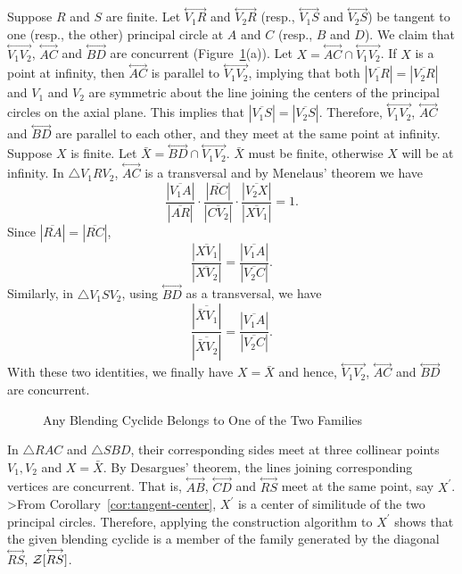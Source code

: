      Suppose $R$ and $S$ are finite. 
Let $\stackrel{\longleftrightarrow}{V_1R}$ and 
$\stackrel{\longleftrightarrow}{V_2R}$ (resp., 
$\stackrel{\longleftrightarrow}{V_1S}$ and
$\stackrel{\longleftrightarrow}{V_2S}$) be tangent to one (resp., the other)
principal circle at $A$ and $C$ (resp., $B$ and $D$).  We claim that
$\stackrel{\longleftrightarrow}{V_1V_2}$,
$\stackrel{\longleftrightarrow}{AC}$ and
$\stackrel{\longleftrightarrow}{BD}$ are concurrent 
(Figure~\ref{fig:concurrent}(a)).  
Let $X=\stackrel{\longleftrightarrow}{AC}\cap
\stackrel{\longleftrightarrow}{V_1V_2}$.  If $X$ is a point at infinity, then
$\stackrel{\longleftrightarrow}{AC}$ is parallel to
$\stackrel{\longleftrightarrow}{V_1V_2}$, implying that both
$|\overline{V_1R}|=|\overline{V_2R}|$ and $V_1$ and $V_2$ are symmetric about 
the line joining the centers of the principal circles on the axial plane.  
This implies that $|\overline{V_1S}|=|\overline{V_2S}|$.  Therefore, 
$\stackrel{\longleftrightarrow}{V_1V_2}$,
$\stackrel{\longleftrightarrow}{AC}$ and
$\stackrel{\longleftrightarrow}{BD}$ are parallel to each other, and
they meet at the same point at infinity.
Suppose $X$ is finite.  Let $\bar{X}=\stackrel{\longleftrightarrow}{BD}\cap
\stackrel{\longleftrightarrow}{V_1V_2}$.  $\bar{X}$ must be finite, otherwise
$X$ will be at infinity.  In $\bigtriangleup V_1RV_2$,
$\stackrel{\longleftrightarrow}{AC}$ is a transversal and by Menelaus' theorem
we have 
\[ \frac{|\overline{V_1A}|}{|\overline{AR}|}\cdot
   \frac{|\overline{RC}|}{|\overline{CV_2}|}\cdot
   \frac{|\overline{V_2X}|}{|\overline{XV_1}|} = 1. \]
Since $|\overline{RA}|=|\overline{RC}|$,
\[ \frac{|\overline{XV_1}|}{|\overline{XV_2}|} =
   \frac{|\overline{V_1A}|}{|\overline{V_2C}|}. \]
Similarly, in $\bigtriangleup V_1SV_2$, using 
$\stackrel{\longleftrightarrow}{BD}$ as a transversal, we have
\[ \frac{|\overline{\bar{X}V_1}|}{|\overline{\bar{X}V_2}|} =
   \frac{|\overline{V_1A}|}{|\overline{V_2C}|}. \]
With these two identities, we finally have $X=\bar{X}$ and hence,
$\stackrel{\longleftrightarrow}{V_1V_2}$,
$\stackrel{\longleftrightarrow}{AC}$ and
$\stackrel{\longleftrightarrow}{BD}$ are concurrent.
\begin{figure}
\vspace{14cm}
\caption{Any Blending Cyclide Belongs to One of the Two Families}
\label{fig:concurrent}
\end{figure}

     In $\bigtriangleup RAC$ and $\bigtriangleup SBD$, their corresponding 
sides meet at three collinear points $V_1, V_2$ and $X=\bar{X}$.  By
Desargues' theorem, the lines joining corresponding vertices are concurrent.
That is, $\stackrel{\longleftrightarrow}{AB}$,
$\stackrel{\longleftrightarrow}{CD}$ and $\stackrel{\longleftrightarrow}{RS}$
meet at the same point, say $X^\prime$.  
>From Corollary~\ref{cor:tangent-center}, $X^\prime$ is a center of similitude
of the two principal circles.   Therefore, applying the construction 
algorithm to $X^\prime$ shows that the given blending cyclide 
is a member of the family generated by the diagonal 
$\stackrel{\longleftrightarrow}{RS}$, 
${\cal Z}[\stackrel{\longleftrightarrow}{RS}]$.

